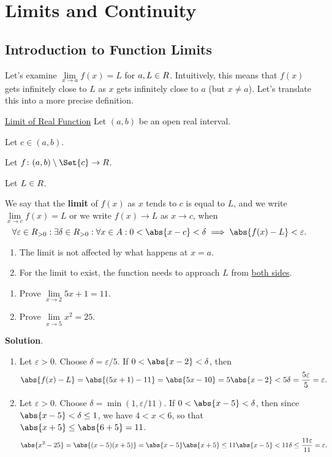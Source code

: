 \chapter{Limits and Continuity}
\section{Introduction to Function Limits}
Let's examine $ \lim\limits_{{x} \to {a}}f(x)=L $ for $ a,L\in\relax{R} $.
Intuitively, this means that $ f(x) $ gets infinitely close to $ L $
as $ x $ gets infinitely close to $ a $ (but $ x\ne a $). Let's translate this
into a more precise definition.
\begin{Definition}{\href{https://proofwiki.org/wiki/Definition:Limit_of_Real_Function}{Limit of Real Function}}{}
    Let $ (a,b) $ be an open real interval.\smallskip

    Let $ c\in(a,b) $.\smallskip

    Let $ f\colon (a,b)\setminus\Set{c}\to\R $.\smallskip

    Let $ L\in\relax{R} $.\smallskip

    We say that the \textbf{limit} of $ f(x) $ as $ x $ tends to $ c $ is equal to $ L $,
    and we write $ \lim\limits_{{x} \to {c}}f(x)=L $ or we write $ f(x)\to L $ as $ x\to c $, when
    \[ \forall \varepsilon\in\R_{>0}:\exists \delta\in\R_{>0}:\forall x\in A: 0<\abs{x-c}<\delta\implies \abs{f(x)-L}<\varepsilon. \]
\end{Definition}
\begin{Remark}{}{}
    \begin{enumerate}[(1)]
        \item The limit is not affected by what happens at $ x=a $.
        \item For the limit to exist, the function needs to approach $ L $ from \underline{both sides}.
    \end{enumerate}
\end{Remark}
\begin{Example}{}{}
    \begin{enumerate}[(1)]
        \item Prove $ \lim\limits_{{x} \to {2}}5x+1=11 $.
        \item Prove $ \lim\limits_{{x} \to {5}}x^2=25 $.
    \end{enumerate}
    \tcblower{}
    \textbf{Solution}.
    \begin{enumerate}[(1)]
        \item Let $ \varepsilon>0 $. Choose $ \delta=\varepsilon/5 $. If $ 0<\abs{x-2}<\delta $, then
              \[ \abs{f(x)-L}=\abs{(5x+1)-11}=\abs{5x-10}=5\abs{x-2}<5\delta=\frac{5\varepsilon}{5}=\varepsilon. \]
        \item Let $ \varepsilon>0 $. Choose $ \delta=\min(1,\varepsilon/11) $. If $ 0<\abs{x-5}<\delta $, then
              since $ \abs{x-5}<\delta\le 1 $, we have $ 4<x<6 $, so that
              $ \abs{x+5}\le \abs{6+5}=11 $.
              \[ \abs{x^2-25}=\abs{(x-5)(x+5)}=\abs{x-5}\abs{x+5}\le 11\abs{x-5}<11\delta\le \frac{11\varepsilon}{11}=\varepsilon. \]
    \end{enumerate}
\end{Example}

